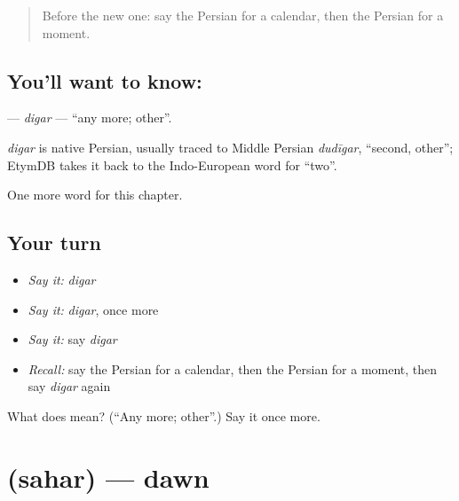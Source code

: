 \label{lesson:FA-C229-digar}



\begin{quote}
Before the new one: say the Persian for a calendar, then the Persian for a moment.
\end{quote}

\subsection*{You'll want to know: }
\textbf{} — \emph{digar} — \textquotedblleft{}any more; other\textquotedblright{}.

\begin{cousinweb}
\emph{digar} is native Persian, usually traced to Middle Persian \emph{dudīgar}, \textquotedblleft{}second, other\textquotedblright{}; EtymDB takes it back to the Indo-European word for \textquotedblleft{}two\textquotedblright{}.
\end{cousinweb}

\begin{grammarlens}[title={What you've built}]
One more word for this chapter.
\end{grammarlens}

\subsection*{Your turn}
\begin{itemize}
\raggedright
  \item \emph{Say it:} \emph{digar}
  \item \emph{Say it:} \emph{digar}, once more
  \item \emph{Say it:} say \emph{digar}
  \item \emph{Recall:} say the Persian for a calendar, then the Persian for a moment, then say \emph{digar} again
\end{itemize}

\begin{tcolorbox}[breakable,colback=teal!4,colframe=teal!35!black,title={Before you move on}]
What does  mean? (\textquotedblleft{}Any more; other\textquotedblright{}.) Say it once more.
\end{tcolorbox}
\section[\texorpdfstring{\fa{سحر} (sahar)}{سحر (sahar)}]{ (sahar) — dawn}


